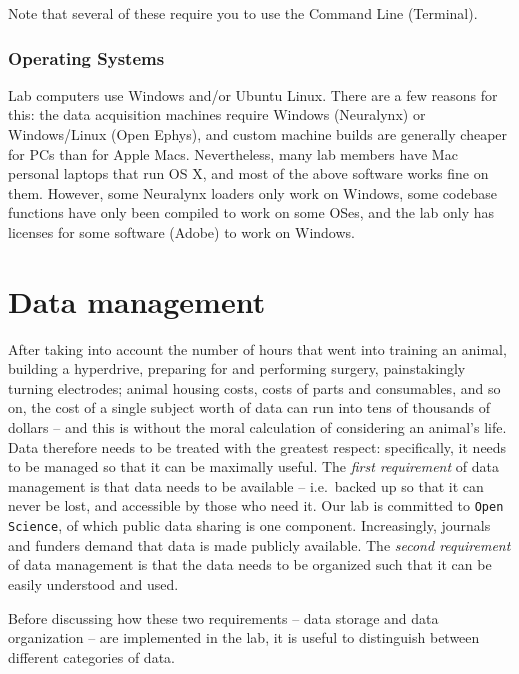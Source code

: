 \documentclass{tufte-book}
\newcommand{\doccls}[1]{\texttt{#1}}%
\begin{document}
Note that several of these require you to use the Command Line
(Terminal).

\subsection{Operating Systems}

Lab computers use Windows and/or Ubuntu Linux. There are a few reasons
for this: the data acquisition machines require Windows (Neuralynx) or
Windows/Linux (Open Ephys), and custom machine builds are generally
cheaper for PCs than for Apple Macs. Nevertheless, many lab members
have Mac personal laptops that run OS X, and most of the above
software works fine on them. However, some Neuralynx loaders only work
on Windows, some codebase functions have only been compiled to work on
some OSes, and the lab only has licenses for some software (Adobe) to
work on Windows.

\chapter{Data management}

 After taking into account the number of
hours that went into training an animal, building a hyperdrive,
preparing for and performing surgery, painstakingly turning
electrodes; animal housing costs, costs of parts and consumables, and
so on, the cost of a single subject worth of data can run into tens of
thousands of dollars -- and this is without the moral calculation of
considering an animal's life. Data therefore needs to be treated with
the greatest respect: specifically, it needs to be managed so that it
can be maximally useful. The {\it first requirement} of data
management is that data needs to be available -- i.e.\ backed up so
that it can never be lost, and accessible by those who need it. Our
lab is committed to \doccls{Open Science}, of which public data
sharing is one component. Increasingly, journals and funders demand
that data is made publicly available. The {\it second requirement} of
data management is that the data needs to be organized such that it
can be easily understood and used.

Before discussing how these two requirements -- data storage and data
organization -- are implemented in the lab, it is useful to
distinguish between different categories of data.
\end{document}
